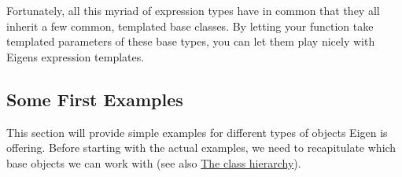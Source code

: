 Fortunately, all this myriad of expression types have in common that they all inherit a few common, templated base classes. By letting your function take templated parameters of these base types, you can let them play nicely with Eigen\textquotesingle{}s expression templates.\hypertarget{_topic_function_taking_eigen_types_TopicFirstExamples}{}\subsection{Some First Examples}\label{_topic_function_taking_eigen_types_TopicFirstExamples}
This section will provide simple examples for different types of objects Eigen is offering. Before starting with the actual examples, we need to recapitulate which base objects we can work with (see also \hyperlink{TopicClassHierarchy}{The class hierarchy}).

